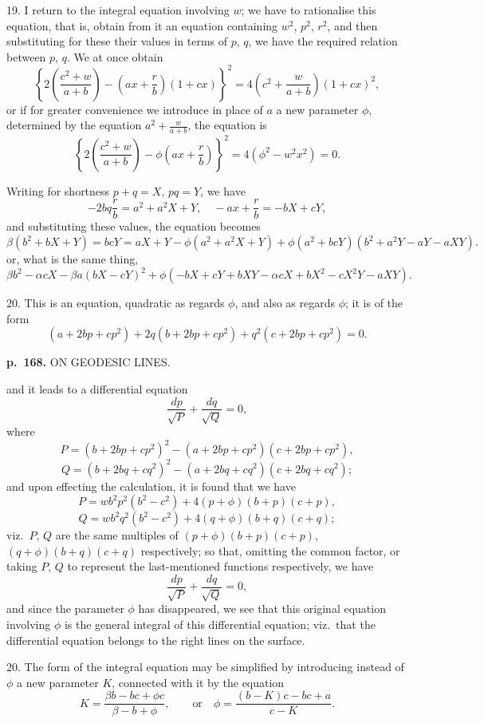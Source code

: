 \documentclass[11pt,a4paper]{book}
\begin{document}
19. I return to the integral equation involving $w$; we have to rationalise this
equation, that is, obtain from it an equation containing $w^2$, $p^2$, $r^2$, and then substituting
for these their values in terms of $p$, $q$, we have the required relation between $p$, $q$.
We at once obtain
\[
\left\{ 2 \left( \frac{c^2 + w}{a + b} \right) - \left( a x + \frac{r}{b} \right) (1 + c x) \right\}^2 = 4 \left( c^2 + \frac{w}{a+b} \right) (1 + c x)^2,
\]
or if for greater convenience we introduce in place of $a$ a new parameter $\phi$, determined by the equation $a^2 + \frac{w}{a+b}$, the equation is
\[
\left\{ 2 \left( \frac{c^2 + w}{a+b} \right) - \phi \left( a x + \frac{r}{b} \right) \right\}^2 = 4 (\phi^2 - w^2 x^2) = 0.
\]

Writing for shortness $p + q = X$, $pq = Y$, we have
\[
- 2bq\frac{r}{b} = a^2 + a^2 X + Y, \quad -ax + \frac{r}{b} = -bX + cY,
\]
and substituting these values, the equation becomes
\[
\beta (b^2 + bX + Y) = bcY = aX + Y - \phi (a^2 + a^2 X + Y) + \phi (a^2 + bcY)(b^2 + a^2 Y - aY - aXY).
\]
or, what is the same thing,
\[
\beta b^2 - \alpha c X - \beta a (b X - cY)^2 + \phi (-b X + cY + b X Y - \alpha c X + bX^2 - c X^2 Y - aXY).
\]

20. This is an equation, quadratic as regards $\phi$, and also as regards $\phi$; it is of the form
\[
(a + 2bp + cp^2)
+ 2q (b + 2bp + cp^2)
+ q^2 (c + 2bp + cp^2) = 0.
\]

\clearpage

\noindent
\textbf{p.~168.}  ON GEODESIC LINES.

and it leads to a differential equation
\[
\frac{dp}{\sqrt{P}} + \frac{dq}{\sqrt{Q}} = 0,
\]
where
\[
P = (b + 2bp + cp^2)^2 - (a + 2bp + cp^2)(c + 2bp + cp^2),
\]
\[
Q = (b + 2bq + cq^2)^2 - (a + 2bq + cq^2)(c + 2bq + cq^2);
\]
and upon effecting the calculation, it is found that we have
\[
P = w b^2 p^2 (b^2 - c^2) + 4(p + \phi)(b + p)(c + p),
\]
\[
Q = w b^2 q^2 (b^2 - c^2) + 4(q + \phi)(b + q)(c + q);
\]
viz.\ $P$, $Q$ are the same multiples of $(p+\phi)(b+p)(c+p)$, $(q+\phi)(b+q)(c+q)$ respectively; so that, omitting the common factor, or taking $P$, $Q$ to represent the last-mentioned functions respectively, we have
\[
\frac{dp}{\sqrt{P}} + \frac{dq}{\sqrt{Q}} = 0,
\]
and since the parameter $\phi$ has disappeared, we see that this original equation involving $\phi$ is the general integral of this differential equation; viz.\ that the differential equation belongs to the right lines on the surface.

20. The form of the integral equation may be simplified by introducing instead of $\phi$ a new parameter $K$, connected with it by the equation
\[
K = \frac{\beta b - bc + \phi c}{\beta - b + \phi}, \qquad \text{or} \quad \phi = \frac{(b - K)c - bc + a}{c - K}.
\]
\end{document}
